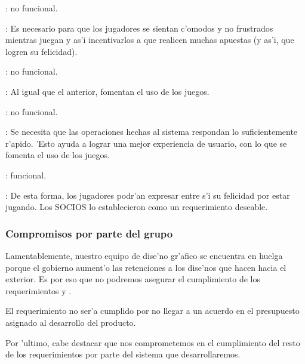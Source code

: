 : no funcional.

: Es necesario para que los jugadores se sientan c'omodos y no frustrados mientras juegan y as'i incentivarlos a que realicen muchas apuestas (y as'i, que logren su felicidad).


    
	
: no funcional.

: Al igual que el anterior, fomentan el uso de los juegos.

    
	
: no funcional.

: Se necesita que las operaciones hechas al sistema respondan lo suficientemente r'apido. 'Esto ayuda a lograr una mejor experiencia de usuario, con lo que se fomenta el uso de los juegos.

    
	
: funcional.

: De esta forma, los jugadores podr'an expresar entre s'i su felicidad por estar jugando. Los SOCIOS lo establecieron como un requerimiento deseable.





\subsubsection{Compromisos por parte del grupo}
Lamentablemente, nuestro equipo de dise'no gr'afico se encuentra en huelga porque el gobierno aument'o las retenciones a los dise'nos que hacen hacia el exterior. Es por eso que no podremos asegurar el cumplimiento de los requerimientos  y . 

El requerimiento  no ser'a cumplido por no llegar a un acuerdo en el presupuesto asignado al desarrollo del producto.

Por 'ultimo, cabe destacar que nos comprometemos en el cumplimiento del resto de los requerimientos por parte del sistema que desarrollaremos.

